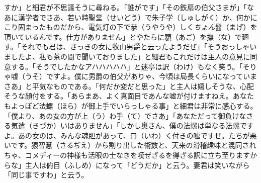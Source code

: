 \documentclass{book}
\begin{document}
すか」と細君が不思議そうに尋ねる。「誰がです」「その鉄扇の伯父さまが」「なあに漢学者でさあ、若い時聖堂（せいどう）で朱子学（しゅしがく）か、何かにこり固まったものだから、電気灯の下で恭（うやうや）しく\emph{ちょん}髷（まげ）を頂いているんです。仕方がありません」とやたらに顋（あご）を撫（な）で廻す。「それでも君は、さっきの女に牧山男爵と云ったようだぜ」「そうおっしゃいましたよ、私も茶の間で聞いておりました」と細君もこれだけは主人の意見に同意する。「そうでしたかなアハハハハハ」と迷亭は訳（わけ）もなく笑う。「そりゃ嘘（うそ）ですよ。僕に男爵の伯父がありゃ、今頃は局長くらいになっていまさあ」と平気なものである。「何だか変だと思った」と主人は嬉しそうな、心配そうな顔付をする。「あらまあ、よく真面目であんな嘘が付けますねえ。あなたもよっぽど法螺（ほら）が御上手でいらっしゃる事」と細君は非常に感心する。「僕より、あの女の方が上（う）わ手（て）でさあ」「あなただって御負けなさる気遣（きづか）いはありません」「しかし奥さん、僕の法螺は単なる法螺ですよ。あの女のは、みんな魂胆があって、曰（いわ）く付きの嘘ですぜ。たちが悪いです。猿智慧（さるぢえ）から割り出した術数と、天来の滑稽趣味と混同されちゃ、コメディーの神様も活眼の士なきを嘆ぜざるを得ざる訳に立ち至りますからな」主人は俯目（ふしめ）になって「どうだか」と云う。妻君は笑いながら「同じ事ですわ」と云う。
\end{document}
